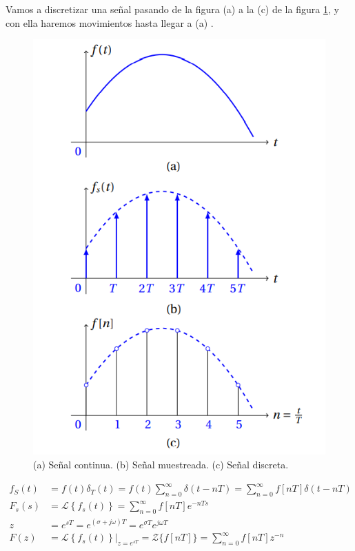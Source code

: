 Vamos a discretizar una señal pasando de la figura (a) a la (c) de la figura \ref{fig:000002}, y con ella haremos movimientos hasta llegar a (a) .



\begin{figure}[h!]
	\centering
	\includegraphics[scale=0.5]{img/000002}
	\caption{(a) Señal continua. (b) Señal muestreada. (c) Señal discreta.}
	\label{fig:000002}
\end{figure}

\setlength{\abovedisplayshortskip}{10pt}
\addtolength{\jot}{0.5em}

\begin{align}
	f_{S}(t) &=f(t) \delta_{T}(t)=f(t) \sum_{n=0}^{\infty} \delta(t-n T)=\sum_{n=0}^{\infty} f[n T] \delta(t-n T) \\
	F_{s}(s) &=\mathscr{L}\left\{f_{s}(t)\right\}=\sum_{n=0}^{\infty} f[n T] e^{-n T s} \label{cu-2} \\ 
	z & =e^{s T}=e^{(\sigma+j \omega) T}=e^{\sigma T} e^{j \omega T} \\
	F(z) &=\left.\mathscr{L}\left\{f_{s}(t)\right\}\right|_{z=e^{s T}}=\mathcal{Z}\{f[nT]\}=\sum_{n=0}^{\infty} f[n T] z^{-n} \label{cu4}
\end{align}


